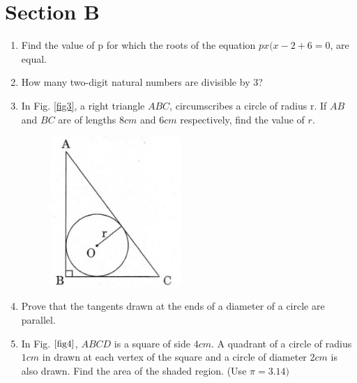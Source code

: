 \documentclass[journal,12pt,twocolumn]{IEEEtran}
\renewcommand\thesection{\arabic{section}}
\begin{document}
\section{Section B}
\renewcommand{\theequation}{\theenumi}
\begin{enumerate}[label=\thesection.\arabic*.,ref=\thesection.\theenumi]
\item Find the value of p for which the roots of the equation $px(x-2+6=0$, are equal.\\
\item How many two-digit natural numbers are divisible by 3?\\
\item In Fig. \ref{fig3}, a right triangle $ABC$, circumscribes a circle of radius r. If $AB$ and $BC$ are of lengths $8cm$ and $6cm$ respectively, find the value of $r$. \\

\begin{figure}[h!]
    \centering
    \includegraphics[width=5cm]{3.png}
 \end{figure}
\item Prove that the tangents drawn at the ends of a diameter of a circle are parallel.\\
\item In Fig. $\ref{fig4}$, $ABCD$ is a square of side $4 cm$. A quadrant of a circle of radius $1 cm$ in drawn at each vertex of the square and a circle of diameter $2 cm$ is also drawn. Find the area of the shaded region. (Use $\pi = 3.14)$\\


\end{enumerate}
\end{document}
